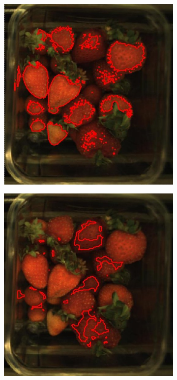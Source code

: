 \documentclass[fleqn,twoside,12pt]{report}
\begin{document}
\begin{figure}[ht]
\begin{subfigure}{.30\textwidth}
		\includegraphics[width=.9\linewidth]{over_hue.jpg}
		\caption{}
		\label{fig:over_hue}
	\end{subfigure}%
	\begin{subfigure}{.30\textwidth}
		\centering
		\includegraphics[width=.9\linewidth]{over_diff_hue.jpg}
		\caption{}
		\label{fig:over_diff}
	\end{subfigure}%


\end{figure}
\end{document}
